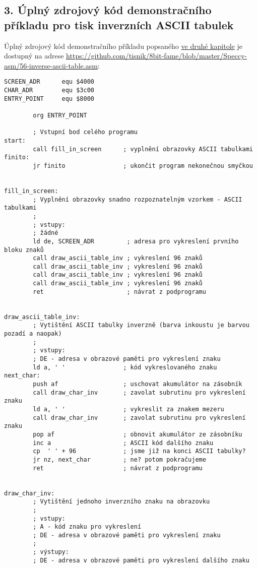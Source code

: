 \documentclass{article}
\begin{document}
\hypertarget{k03}{%
\subsection{3. Úplný zdrojový kód demonstračního příkladu pro tisk
inverzních ASCII tabulek}\label{k03}}

Úplný zdrojový kód demonstračního příkladu popsaného
\protect\hyperlink{k02}{ve druhé kapitole} je dostupný na adrese
\url{https://github.com/tisnik/8bit-fame/blob/master/Speccy-asm/56-inverse-ascii-table.asm}:

\begin{verbatim}
SCREEN_ADR      equ $4000
CHAR_ADR        equ $3c00
ENTRY_POINT     equ $8000
 
        org ENTRY_POINT
 
        ; Vstupní bod celého programu
start:
        call fill_in_screen      ; vyplnění obrazovky ASCII tabulkami
finito:
        jr finito                ; ukončit program nekonečnou smyčkou
 
 
fill_in_screen:
        ; Vyplnění obrazovky snadno rozpoznatelným vzorkem - ASCII tabulkami
        ;
        ; vstupy:
        ; žádné
        ld de, SCREEN_ADR         ; adresa pro vykreslení prvního bloku znaků
        call draw_ascii_table_inv ; vykreslení 96 znaků
        call draw_ascii_table_inv ; vykreslení 96 znaků
        call draw_ascii_table_inv ; vykreslení 96 znaků
        call draw_ascii_table_inv ; vykreslení 96 znaků
        ret                       ; návrat z podprogramu
 
 
draw_ascii_table_inv:
        ; Vytištění ASCII tabulky inverzně (barva inkoustu je barvou pozadí a naopak)
        ;       
        ; vstupy:
        ; DE - adresa v obrazové paměti pro vykreslení znaku
        ld a, ' '                ; kód vykreslovaného znaku
next_char:
        push af                  ; uschovat akumulátor na zásobník
        call draw_char_inv       ; zavolat subrutinu pro vykreslení znaku
        ld a, ' '                ; vykreslit za znakem mezeru
        call draw_char_inv       ; zavolat subrutinu pro vykreslení znaku
        pop af                   ; obnovit akumulátor ze zásobníku
        inc a                    ; ASCII kód dalšího znaku
        cp  ' ' + 96             ; jsme již na konci ASCII tabulky?
        jr nz, next_char         ; ne? potom pokračujeme
        ret                      ; návrat z podprogramu
 
 
draw_char_inv:
        ; Vytištění jednoho inverzního znaku na obrazovku
        ;
        ; vstupy:
        ; A - kód znaku pro vykreslení
        ; DE - adresa v obrazové paměti pro vykreslení znaku
        ;
        ; výstupy:
        ; DE - adresa v obrazové paměti pro vykreslení dalšího znaku

\end{verbatim}
\end{document}
